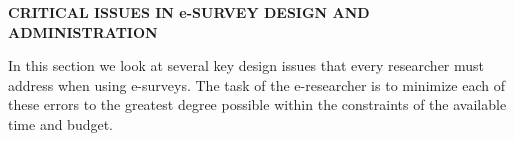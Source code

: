 \documentclass [10pt,a4paper]{book}
\begin{document}
\begin{flushleft}
\textbf{CRITICAL ISSUES IN e-SURVEY DESIGN AND ADMINISTRATION}
\end{flushleft}

In this section we look at several key design issues that every researcher must address
when using e-surveys. The task of the e-researcher is to minimize each of these errors
to the greatest degree possible within the constraints of the available time and budget.
\end{document}
